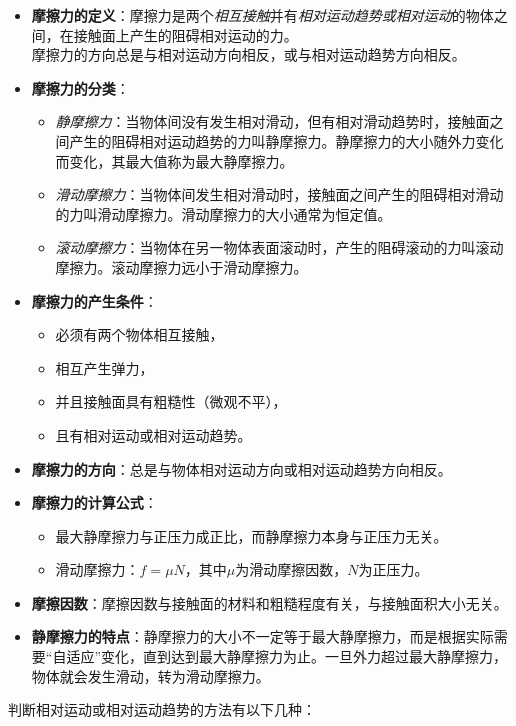 \documentclass[a4paper, landscape, 10pt, twocolumn]{article}
\begin{document}
\begin{itemize}
  \item
    \textbf{摩擦力的定义}：摩擦力是两个\emph{相互接触}并有\emph{相对运动趋势或相对运动}的物体之间，在接触面上产生的阻碍相对运动的力。\\
    摩擦力的方向总是与相对运动方向相反，或与相对运动趋势方向相反。
  \item \textbf{摩擦力的分类}：
    \begin{itemize}
      \item
        \emph{静摩擦力}：当物体间没有发生相对滑动，但有相对滑动趋势时，接触面之间产生的阻碍相对运动趋势的力叫静摩擦力。静摩擦力的大小随外力变化而变化，其最大值称为最大静摩擦力。
      \item \emph{滑动摩擦力}：当物体间发生相对滑动时，接触面之间产生的阻碍相对滑动的力叫滑动摩擦力。滑动摩擦力的大小通常为恒定值。
      \item \emph{滚动摩擦力}：当物体在另一物体表面滚动时，产生的阻碍滚动的力叫滚动摩擦力。滚动摩擦力远小于滑动摩擦力。
    \end{itemize}
  \item \textbf{摩擦力的产生条件}：
    \begin{itemize}
      \item 必须有两个物体相互接触，
      \item 相互产生弹力，
      \item 并且接触面具有粗糙性（微观不平），
      \item 且有相对运动或相对运动趋势。
    \end{itemize}
  \item \textbf{摩擦力的方向}：总是与物体相对运动方向或相对运动趋势方向相反。
  \item \textbf{摩擦力的计算公式}：
    \begin{itemize}
      \item 最大静摩擦力与正压力成正比，而静摩擦力本身与正压力无关。
      \item 滑动摩擦力：$f = \mu N$，其中$\mu$为滑动摩擦因数，$N$为正压力。
    \end{itemize}
  \item \textbf{摩擦因数}：摩擦因数与接触面的材料和粗糙程度有关，与接触面积大小无关。
  \item
    \textbf{静摩擦力的特点}：静摩擦力的大小不一定等于最大静摩擦力，而是根据实际需要“自适应”变化，直到达到最大静摩擦力为止。一旦外力超过最大静摩擦力，物体就会发生滑动，转为滑动摩擦力。
\end{itemize}
判断相对运动或相对运动趋势的方法有以下几种：
\end{document}
